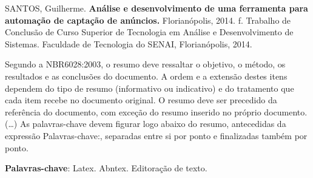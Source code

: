 
\noindent
SANTOS, Guilherme. \textbf{Análise e desenvolvimento de uma ferramenta para automação de captação de anúncios.}
Florianópolis, 2014. \pageref{nropaginas}f. Trabalho de Conclusão de Curso Superior de Tecnologia em
Análise e Desenvolvimento de Sistemas. Faculdade de Tecnologia do SENAI, Florianópolis, 2014.

\vspace{1cm}
\setlength{\absparsep}{18pt} %
\begin{resumo}
 Segundo a NBR6028:2003, o resumo deve ressaltar o
 objetivo, o método, os resultados e as conclusões do documento. A ordem e a extensão
 destes itens dependem do tipo de resumo (informativo ou indicativo) e do
 tratamento que cada item recebe no documento original. O resumo deve ser
 precedido da referência do documento, com exceção do resumo inserido no
 próprio documento. (\ldots) As palavras-chave devem figurar logo abaixo do
 resumo, antecedidas da expressão Palavras-chave:, separadas entre si por
 ponto e finalizadas também por ponto.

 \textbf{Palavras-chave}: Latex. Abntex. Editoração de texto.
\end{resumo}
